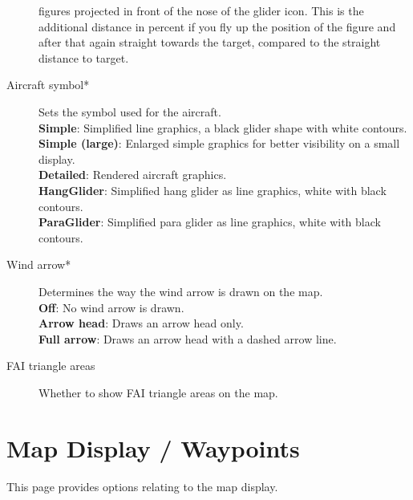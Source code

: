 \begin{description}
  figures projected in front of the nose of the glider icon.  This is the
  additional distance in percent if you fly up the position of the figure and
  after that again straight towards the target, compared to the straight distance
  to target.
\item[Aircraft symbol*]  Sets the symbol used for the aircraft. \\
  {\bf Simple}: Simplified line graphics, a black glider shape with white contours. \\
  {\bf Simple (large)}: Enlarged simple graphics for better visibility on a small display. \\
  {\bf Detailed}: Rendered aircraft graphics. \\
  {\bf HangGlider}: Simplified hang glider as line graphics, white with black contours. \\
  {\bf ParaGlider}: Simplified para glider as line graphics, white with black contours.
\item[Wind arrow*]  Determines the way the wind arrow is drawn on the map. \\
  {\bf Off}: No wind arrow is drawn. \\
  {\bf Arrow head}: Draws an arrow head only. \\
  {\bf Full arrow}: Draws an arrow head with a dashed arrow line.
\item[FAI triangle areas] Whether to show FAI triangle areas on the map.
  
\end{description}


\section{Map Display / Waypoints}\label{sec:waypoint-display}

This page provides options relating to the map display.

